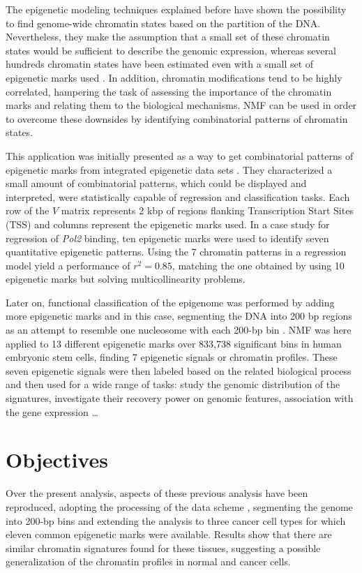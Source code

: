 The epigenetic modeling techniques explained before have shown the possibility to find genome-wide chromatin states based on the partition of the DNA. Nevertheless, they make the assumption that a small set of these chromatin states would be sufficient to describe the genomic expression, whereas several hundreds chromatin states have been estimated even with a small set of epigenetic marks used \cite{Ucar2011}. In addition, chromatin modifications tend to be highly correlated, hampering the task of assessing the importance of the chromatin marks and relating them to the biological mechanisms. NMF can be used in order to overcome these downsides by identifying combinatorial patterns of chromatin states.

\medskip

This application was initially presented as a way to get combinatorial patterns of epigenetic marks from integrated epigenetic data sets \cite{Cieslik2014}. They characterized a small amount of combinatorial patterns, which could be displayed and interpreted, were statistically capable of regression and classification tasks. Each row of the \(V\) matrix represents 2 kbp of regions flanking Transcription Start Sites (TSS) and columns represent the epigenetic marks used. In a case study for regression of \textit{Pol2} binding, ten epigenetic marks were used to identify seven quantitative epigenetic patterns. Using the 7 chromatin patterns in a regression model yield a performance of \( r^2 = 0.85 \), matching the one obtained by using 10 epigenetic marks but solving multicollinearity problems.

\medskip

Later on, functional classification of the epigenome was performed by adding more epigenetic marks and in this case, segmenting the DNA into 200 bp regions as an attempt to resemble one nucleosome with each 200-bp bin \cite{Gandolfi2017}. NMF was here applied to 13 different epigenetic marks over 833,738 significant bins in human embryonic stem cells, finding 7 epigenetic signals or chromatin profiles. These seven epigenetic signals were then labeled based on the related biological process and then used for a wide range of tasks: study the genomic distribution of the signatures, investigate their recovery power on genomic features, association with the gene expression \ldots




\section{Objectives}

Over the present analysis, aspects of these previous analysis have been reproduced, adopting the processing of the data scheme \cite{Gandolfi2017}, segmenting the genome into 200-bp bins and extending the analysis to three cancer cell types for which eleven common epigenetic marks were available. Results show that there are similar chromatin signatures found for these tissues, suggesting a possible generalization of the chromatin profiles in normal and cancer cells.
